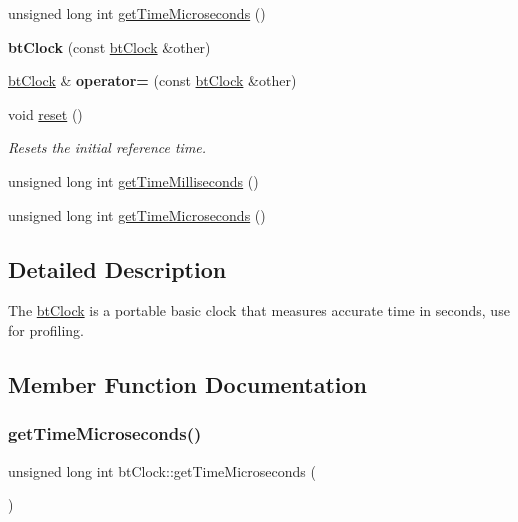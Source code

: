 \begin{DoxyCompactItemize}
unsigned long int \hyperlink{classbtClock_a94dd567e0fb67862832446c884f1a223}{get\+Time\+Microseconds} ()
\item 
\mbox{\label{classbtClock_a16cbad5225f0d2ab96e18e7e9b864ca6}} 
{\bfseries bt\+Clock} (const \hyperlink{classbtClock}{bt\+Clock} \&other)
\item 
\mbox{\label{classbtClock_a07cbdc935874b1d5612d82703192a733}} 
\hyperlink{classbtClock}{bt\+Clock} \& {\bfseries operator=} (const \hyperlink{classbtClock}{bt\+Clock} \&other)
\item 
\mbox{\label{classbtClock_a592eb764c2e7b645c9619ab7e483166c}} 
void \hyperlink{classbtClock_a592eb764c2e7b645c9619ab7e483166c}{reset} ()
\begin{DoxyCompactList}\small\item\em Resets the initial reference time. \end{DoxyCompactList}\item 
unsigned long int \hyperlink{classbtClock_ae2c3da98828b79c1966c47c20b45b32f}{get\+Time\+Milliseconds} ()
\item 
unsigned long int \hyperlink{classbtClock_a94dd567e0fb67862832446c884f1a223}{get\+Time\+Microseconds} ()
\end{DoxyCompactItemize}


\subsection{Detailed Description}
The \hyperlink{classbtClock}{bt\+Clock} is a portable basic clock that measures accurate time in seconds, use for profiling. 

\subsection{Member Function Documentation}
\mbox{\label{classbtClock_a94dd567e0fb67862832446c884f1a223}} 
\subsubsection{\texorpdfstring{get\+Time\+Microseconds()}{getTimeMicroseconds()}\hspace{0.1cm}{\footnotesize\ttfamily [1/2]}}
{\footnotesize\ttfamily unsigned long int bt\+Clock\+::get\+Time\+Microseconds (\begin{DoxyParamCaption}{ }\end{DoxyParamCaption})}

